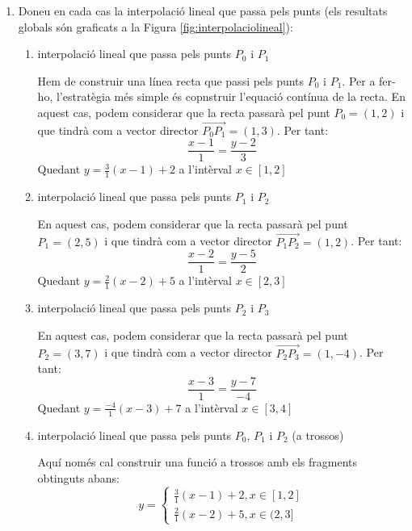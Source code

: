\begin{enumerate}

  \item Doneu en cada cas la interpolació lineal que passa pels punts (els resultats globals són graficats a la Figura \ref{fig:interpolaciolineal}):

\begin{enumerate}

  \item interpolació lineal que passa pels punts $P_0$ i $P_1$

Hem de construir una línea recta que passi pels punts $P_0$ i $P_1$. Per a fer-ho, l'estratègia més simple és copnstruir l'equació contínua de la recta. En aquest cas, podem considerar que la recta passarà pel punt $P_0=(1,2)$ i que tindrà com a vector director $\overrightarrow{P_0P_1}=(1,3)$. Per tant:
\begin{equation}
\frac{x-1}{1}=\frac{y-2}{3}
\end{equation}
Quedant $y=\frac{3}{1}(x-1)+2$ a l'intèrval $x\in[1,2]$
\blacksquare

  \item interpolació lineal que passa pels punts $P_1$ i $P_2$

  En aquest cas, podem considerar que la recta passarà pel punt $P_1=(2,5)$ i que tindrà com a vector director $\overrightarrow{P_1P_2}=(1,2)$. Per tant:
  \begin{equation}
    \frac{x-2}{1}=\frac{y-5}{2}
  \end{equation}
  Quedant $y=\frac{2}{1}(x-2)+5$ a l'intèrval $x\in[2,3]$
  \blacksquare

  \item interpolació lineal que passa pels punts $P_2$ i $P_3$

  En aquest cas, podem considerar que la recta passarà pel punt $P_2=(3,7)$ i que tindrà com a vector director $\overrightarrow{P_2P_3}=(1,-4)$. Per tant:
  \begin{equation}
    \frac{x-3}{1}=\frac{y-7}{-4}
  \end{equation}
  Quedant $y=\frac{-4}{1}(x-3)+7$ a l'intèrval $x\in[3,4]$
  \blacksquare

  \item interpolació lineal que passa pels punts $P_0$, $P_1$ i $P_2$ (a trossos)

  Aquí només cal construir una funció a trossos amb els fragments obtinguts abans:
  \begin{equation}
    y= \begin{cases}
           \frac{3}{1}(x-1)+2 , x \in [1,2]\\
           \frac{2}{1}(x-2)+5 , x \in (2,3]
          \end{cases}
  \end{equation}
  \blacksquare


\end{enumerate}
\end{enumerate}

